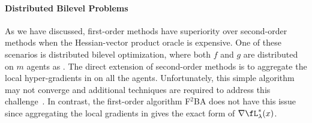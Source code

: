 \documentclass{article}
\begin{document}
\paragraph{Distributed Bilevel Problems} 

As we have discussed, first-order methods have superiority over second-order methods when the Hessian-vector product oracle is expensive.
One of these scenarios is distributed bilevel optimization, where both $f$ and $g$ are distributed on $m$ agents as . The direct extension of second-order methods is to aggregate the local hyper-gradients in  on all the agents. Unfortunately, this simple algorithm may not converge and additional techniques are required to address this challenge~\citep{xiao2023communication,tarzanagh2022fednest,chen2022decentralized}. In contrast, the first-order algorithm F${}^2$BA does not have this issue since 
aggregating the local gradients in  gives the exact 
form of $\nabla \fL_{\lambda}^*(x)$.
\end{document}
